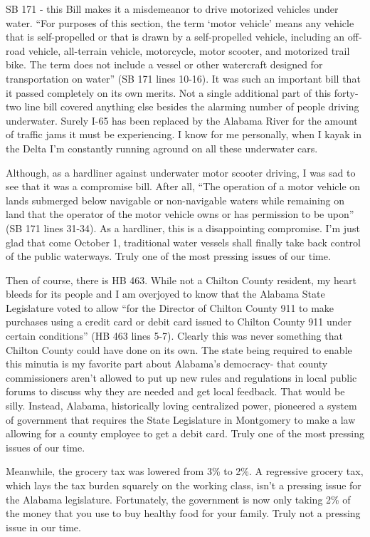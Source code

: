 \documentclass[
]{book}
\begin{document}
SB 171 - this Bill makes it a misdemeanor to drive motorized vehicles under water. ``For purposes of this section, the term `motor vehicle' means any vehicle that is self-propelled or that is drawn by a self-propelled vehicle, including an off-road vehicle, all-terrain vehicle, motorcycle, motor scooter, and motorized trail bike. The term does not include a vessel or other watercraft designed for transportation on water'' (SB 171 lines 10-16). It was such an important bill that it passed completely on its own merits. Not a single additional part of this forty-two line bill covered anything else besides the alarming number of people driving underwater. Surely I-65 has been replaced by the Alabama River for the amount of traffic jams it must be experiencing. I know for me personally, when I kayak in the Delta I'm constantly running aground on all these underwater cars.

Although, as a hardliner against underwater motor scooter driving, I was sad to see that it was a compromise bill. After all, ``The operation of a motor vehicle on lands submerged below navigable or non-navigable waters while remaining on land that the operator of the motor vehicle owns or has permission to be upon'' (SB 171 lines 31-34). As a hardliner, this is a disappointing compromise. I'm just glad that come October 1, traditional water vessels shall finally take back control of the public waterways. Truly one of the most pressing issues of our time.

Then of course, there is HB 463. While not a Chilton County resident, my heart bleeds for its people and I am overjoyed to know that the Alabama State Legislature voted to allow ``for the Director of Chilton County 911 to make purchases using a credit card or debit card issued to Chilton County 911 under certain conditions'' (HB 463 lines 5-7). Clearly this was never something that Chilton County could have done on its own. The state being required to enable this minutia is my favorite part about Alabama's democracy- that county commissioners aren't allowed to put up new rules and regulations in local public forums to discuss why they are needed and get local feedback. That would be silly. Instead, Alabama, historically loving centralized power, pioneered a system of government that requires the State Legislature in Montgomery to make a law allowing for a county employee to get a debit card. Truly one of the most pressing issues of our time.

Meanwhile, the grocery tax was lowered from 3\% to 2\%. A regressive grocery tax, which lays the tax burden squarely on the working class, isn't a pressing issue for the Alabama legislature. Fortunately, the government is now only taking 2\% of the money that you use to buy healthy food for your family. Truly not a pressing issue in our time.
\end{document}
